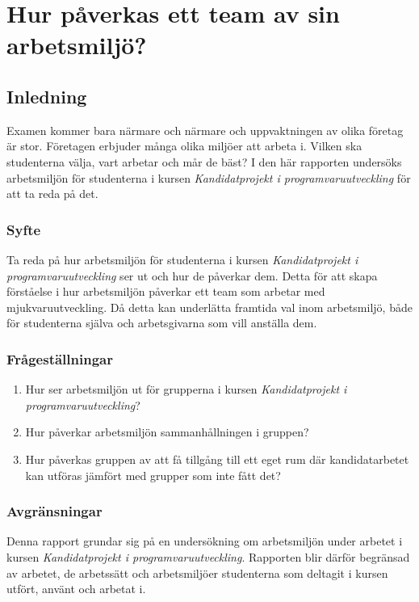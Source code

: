 \chapter{Hur påverkas ett team av sin arbetsmiljö?}
\label{cha:indiv-report-hampus}

\section{Inledning}
\label{sec:introduction-hampus}

Examen kommer bara närmare och närmare och uppvaktningen av olika företag är stor. Företagen erbjuder många olika miljöer att arbeta i. Vilken ska studenterna välja, vart arbetar och mår de bäst? I den här rapporten undersöks arbetsmiljön för studenterna i kursen \textit{Kandidatprojekt i programvaruutveckling} för att ta reda på det.

\subsection{Syfte}
\label{sec:purpose-hampus}

Ta reda på hur arbetsmiljön för studenterna i kursen \textit{Kandidatprojekt i programvaruutveckling} ser ut och hur de påverkar dem. Detta för att skapa förståelse i hur arbetsmiljön påverkar ett team som arbetar med mjukvaruutveckling. Då detta kan underlätta framtida val inom arbetsmiljö, både för studenterna själva och arbetsgivarna som vill anställa dem.

\subsection{Frågeställningar}
\label{sec:issue-hampus}

\begin{enumerate}
\item Hur ser arbetsmiljön ut för grupperna i kursen \textit{Kandidatprojekt i programvaruutveckling}?
\item Hur påverkar arbetsmiljön sammanhållningen i gruppen?
\item Hur påverkas gruppen av att få tillgång till ett eget rum där kandidatarbetet kan utföras jämfört med grupper som inte fått det?
\end{enumerate}

\subsection{Avgränsningar}
Denna rapport grundar sig på en undersökning om arbetsmiljön under arbetet i kursen \textit{Kandidatprojekt i programvaruutveckling}. Rapporten blir därför begränsad av arbetet, de arbetssätt och arbetsmiljöer studenterna som deltagit i kursen utfört, använt och arbetat i.

